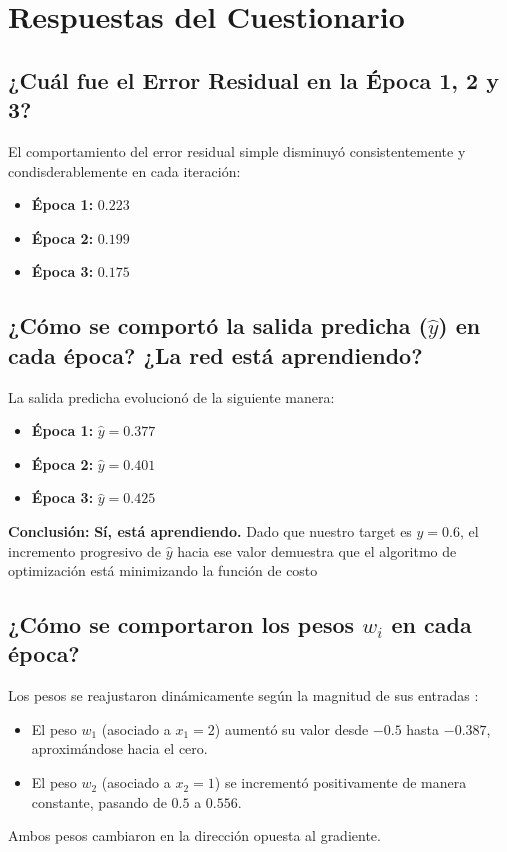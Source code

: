 \documentclass[12pt]{article}
\begin{document}
\newpage

\section{Respuestas del Cuestionario}

\subsection{¿Cuál fue el Error Residual en la Época 1, 2 y 3?}
El comportamiento del error residual simple disminuyó consistentemente y condisderablemente en cada iteración:
\begin{itemize}
    \item \textbf{Época 1:} $0.223$
    \item \textbf{Época 2:} $0.199$
    \item \textbf{Época 3:} $0.175$
\end{itemize}

\subsection{¿Cómo se comportó la salida predicha ($\hat{y}$) en cada época? ¿La red está aprendiendo?}
La salida predicha evolucionó de la siguiente manera:
\begin{itemize}
    \item \textbf{Época 1:} $\hat{y} = 0.377$
    \item \textbf{Época 2:} $\hat{y} = 0.401$
    \item \textbf{Época 3:} $\hat{y} = 0.425$
\end{itemize}
\textbf{Conclusión:} \textbf{Sí, está aprendiendo.} Dado que nuestro target es $y = 0.6$, el incremento progresivo de $\hat{y}$ hacia ese valor demuestra que el algoritmo de optimización está minimizando la función de costo 
\subsection{¿Cómo se comportaron los pesos $w_i$ en cada época?}
Los pesos se reajustaron dinámicamente según la magnitud de sus entradas :
\begin{itemize}
    \item El peso \textbf{$w_1$} (asociado a $x_1 = 2$) aumentó su valor  desde $-0.5$ hasta $-0.387$, aproximándose hacia el cero.
    \item El peso \textbf{$w_2$} (asociado a $x_2 = 1$) se incrementó positivamente de manera constante, pasando de $0.5$ a $0.556$.
\end{itemize}
Ambos pesos cambiaron en la dirección opuesta al gradiente.
\end{document}
